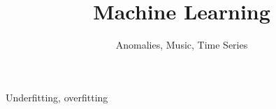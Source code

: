 
\title{Machine Learning}
\subtitle{Anomalies, Music, Time Series}




\begin{frame}
  \titlepage
\end{frame}



\begin{frame}{Underfitting, overfitting}
\end{frame}

\begin{frame}
\end{frame}

\begin{frame}
\end{frame}

\begin{frame}
\end{frame}

\begin{frame}
\end{frame}

\begin{frame}
\end{frame}

\begin{frame}
\end{frame}

\begin{frame}
\end{frame}

\begin{frame}
\end{frame}


